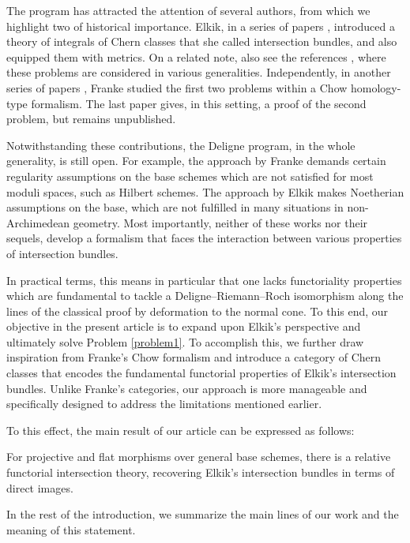 The program has attracted the attention of several authors, from which we highlight two of historical importance. Elkik, in a series of papers \cite{Elkikfib, Elkikmetr}, introduced a theory of integrals of Chern classes that she called intersection bundles, and also equipped them with metrics. On a related note, also see the references \cite{Boucksom-Eriksson, Ducrot, Munoz}, where these problems are considered in various generalities. Independently, in another series of papers \cite{FrankeChow, FrankeChern, Franke}, Franke studied the first two problems within a Chow homology-type formalism. The last paper gives, in this setting, a proof of the second problem, but remains unpublished.

Notwithstanding these contributions, the Deligne program, in the whole generality, is still open. For example, the approach by Franke demands certain regularity assumptions on the base schemes which are not satisfied for most moduli spaces, such as Hilbert schemes. The approach by Elkik makes Noetherian assumptions on the base, which are not fulfilled in many situations in non-Archimedean geometry. Most importantly, neither of these works nor their sequels, develop a formalism that faces the interaction between various properties of intersection bundles.

In practical terms, this means in particular that one lacks functoriality properties which are fundamental to tackle a Deligne--Riemann--Roch isomorphism along the lines of the classical proof by deformation to the normal cone. To this end, our objective in the present article is to expand upon Elkik's perspective and ultimately solve Problem \ref{problem1}. To accomplish this, we further draw inspiration from Franke's Chow formalism and introduce a category of
Chern classes that encodes the fundamental functorial properties of Elkik's intersection bundles. Unlike Franke's categories, our approach is more manageable and specifically designed to address the limitations mentioned earlier.

To this effect, the main result of our article can be expressed as follows:

\begin{theoremMeta} [Informal]
For projective and flat morphisms over general base schemes, there is a relative functorial intersection theory, recovering Elkik's intersection bundles in terms of direct images.
\end{theoremMeta}

In the rest of the introduction, we summarize the main lines of our work and the meaning of this statement.

